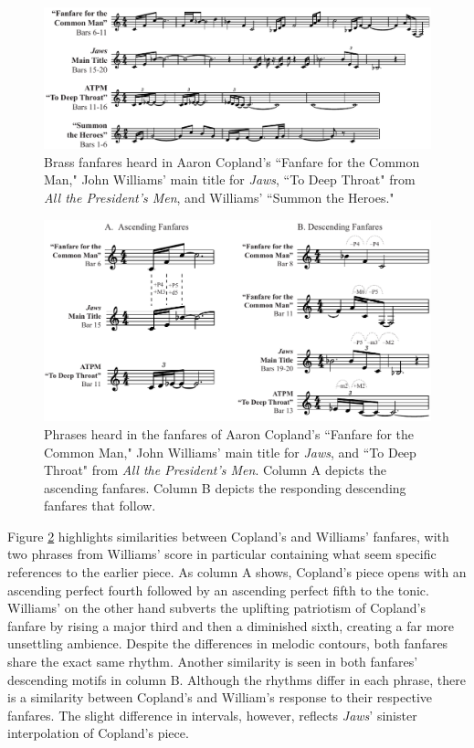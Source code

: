 \begin{figure}
    \centering
    \includegraphics[width=1\linewidth]{img/president-jaws-copland.pdf}
    \caption{Brass fanfares heard in Aaron Copland's ``Fanfare for the Common Man," John Williams' main title for \textit{Jaws}, ``To Deep Throat" from \textit{All the President's Men}, and Williams' ``Summon the Heroes."}
    \label{fig:president-jaws-copland}
\end{figure}

\begin{figure}
    \centering
    \includegraphics[width=1\linewidth]{img/president-jaws-copland-para.pdf}
    \caption{Phrases heard in the fanfares of Aaron Copland's ``Fanfare for the Common Man," John Williams' main title for \textit{Jaws}, and ``To Deep Throat" from \textit{All the President's Men}. Column A depicts the ascending fanfares. Column B depicts the responding descending fanfares that follow.}
    \label{fig:president-jaws-copland-para}\end{figure}

Figure \ref{fig:president-jaws-copland-para} highlights similarities between Copland's and Williams' fanfares, with two phrases from Williams' score in particular containing what seem specific references to the earlier piece.
As column A shows, Copland's piece opens with an ascending perfect fourth followed by an ascending perfect fifth to the tonic.
Williams' on the other hand subverts the uplifting patriotism of Copland's fanfare by rising a major third and then a diminished sixth, creating a far more unsettling ambience.
Despite the differences in melodic contours, both fanfares share the exact same rhythm.
Another similarity is seen in both fanfares' descending motifs in column B.
Although the rhythms differ in each phrase, there is a similarity between Copland's and William's response to their respective fanfares.
The slight difference in intervals, however, reflects \textit{Jaws}' sinister interpolation of Copland's piece.

